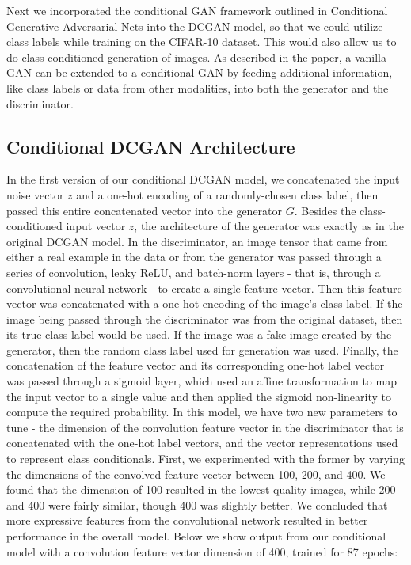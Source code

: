 \documentclass[a4paper]{article}
\begin{document}
Next we incorporated the conditional GAN framework outlined in Conditional Generative Adversarial Nets into the DCGAN model, so that we could utilize class labels while training on the CIFAR-10 dataset. This would also allow us to do class-conditioned generation of images. As described in the paper, a vanilla GAN can be extended to a conditional GAN by feeding additional information, like class labels or data from other modalities, into both the generator and the discriminator. 
\newline
\subsection*{Conditional DCGAN Architecture}
In the first version of our conditional DCGAN model, we concatenated the input noise vector $z$ and a one-hot encoding of a randomly-chosen class label, then passed this entire concatenated vector into the generator $G$. Besides the class-conditioned input vector $z$, the architecture of the generator was exactly as in the original DCGAN model. 
\newline
\newline
In the discriminator, an image tensor that came from either a real example in the data or from the generator was passed through a series of convolution, leaky ReLU, and batch-norm layers - that is, through a convolutional neural network - to create a single feature vector. Then this feature vector was concatenated with a one-hot encoding of the image's class label. If the image being passed through the discriminator was from the original dataset, then its true class label would be used. If the image was a  fake image created by the generator, then the random class label used for generation was used. Finally, the concatenation of the feature vector and its corresponding one-hot label vector was passed through a sigmoid layer, which used an affine transformation to map the input vector to a single value and then applied the sigmoid non-linearity to compute the required probability. 
\newline
\newline
In this model, we have two new parameters to tune - the dimension of the convolution feature vector in the discriminator that is concatenated with the one-hot label vectors, and the vector representations used to represent class conditionals. First, we experimented with the former by varying the dimensions of the convolved feature vector between 100, 200, and 400. We found that the dimension of 100 resulted in the lowest quality images, while 200 and 400 were fairly similar, though 400 was slightly better. We concluded that more expressive features from the convolutional network resulted in better performance in the overall model. Below we show output from our conditional model with a convolution feature vector dimension of 400, trained for 87 epochs:
\end{document}
